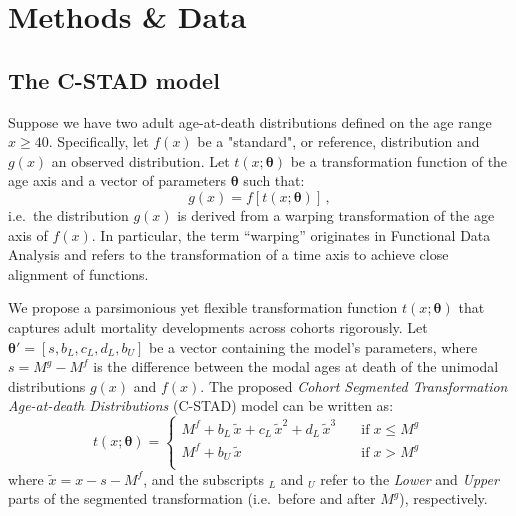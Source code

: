 \documentclass[11pt, a4paper]{article}
\begin{document}
\section{Methods \& Data}
\label{Sec:Methods}
\subsection{The C-STAD model}
\label{Subsec:C-STADmodel}
Suppose we have two adult age-at-death distributions defined on the age range $x \geq 40$. Specifically, let $f(x)$ be a "standard", or reference, distribution and $g(x)$ an observed distribution. Let $t(x;\bm{\theta})$ be a transformation function of the age axis and a vector of parameters $\bm{\theta}$ such that:
%
\begin{equation}\label{Eq:gxftx}
g(x) = f\left[t(x;\bm{\theta})\right]\,, 
\end{equation}  
%
i.e.~the distribution $g(x)$ is derived from a warping transformation of the age axis of $f(x)$. In particular, the term ``warping'' originates in Functional Data Analysis \citep{ramsay2005FDA} and refers to the transformation of a time axis to achieve close alignment of functions. \par

We propose a parsimonious yet flexible transformation function $t(x;\bm{\theta})$ that captures adult mortality developments across cohorts rigorously. Let $\bm{\theta}' = \left[s,b_{L},c_{L},d_{L},b_{U}\right]$ be a vector containing the model's parameters, where $s = M^{g} - M^{f}$ is the difference between the modal ages at death of the unimodal distributions $g(x)$ and $f(x)$. The proposed \emph{Cohort Segmented Transformation Age-at-death Distributions} (C-STAD) model can be written as: 
%
\begin{equation}\label{Eq:tx}
t(x;\bm{\theta}) = \left\{ \begin{array}{ll}
M^{f} + b_{L}\,\tilde{x} + c_{L}\,\tilde{x}^2 + d_{L}\,\tilde{x}^3 \quad & \mathrm{if} \; x \leq M^{g} \, \\
M^{f} + b_{U}\,\tilde{x} \quad & \mathrm{if} \; x > M^{g} \\
\end{array}
\right.
\end{equation} 
%
where $\tilde{x}=x - s - M^{f}$, and the subscripts $_L$ and $_U$ refer to the \textit{Lower} and \textit{Upper} parts of the segmented transformation (i.e.~before and after $M^{g}$), respectively. \par
\end{document}
